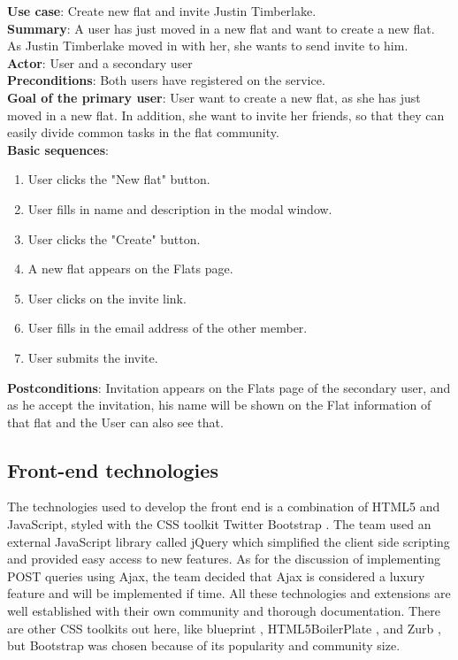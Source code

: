 \documentclass{sig-alt-release2}
\begin{document}
\noindent
\textbf{Use case}: Create new flat and invite Justin Timberlake. \\
\textbf{Summary}: A user has just moved in a new flat and want to create a new flat. As Justin Timberlake moved in with her, she wants to send invite to him. \\
\textbf{Actor}: User and a secondary user \\
\textbf{Preconditions}: Both users have registered on the service.  \\
\textbf{Goal of the primary user}: User want to create a new flat, as she has just moved in a new flat. In addition, she want to invite her friends, so that they can easily divide common tasks in the flat community. \\
\textbf{Basic sequences}:
\begin{enumerate}
\item User clicks the "New flat" button.
\item User fills in name and description in the modal window.
\item User clicks the "Create" button.
\item A new flat appears on the Flats page.
\item User clicks on the invite link.
\item User fills in the email address of the other member.
\item User submits the invite.
\end{enumerate}
\textbf{Postconditions}: Invitation appears on the Flats page of the secondary user, and as he accept the invitation, his name will be shown on the Flat information of that flat and the User can also see that. \\

\subsection{Front-end technologies}

The technologies used to develop the front end is a combination of HTML5 and JavaScript, styled with the CSS toolkit Twitter Bootstrap \cite{x14}. The team used an external JavaScript library called jQuery \cite{x15} which simplified the client side scripting and provided easy access to new features. As for the discussion of implementing POST queries using Ajax, the team decided that Ajax is considered a luxury feature and will be implemented if time. All these technologies and extensions are well established with their own community and thorough documentation. There are other CSS toolkits out here, like blueprint \cite{x16}, HTML5BoilerPlate \cite{x17}, and Zurb \cite{x18}, but Bootstrap was chosen because of its popularity and community size. 
\end{document}

